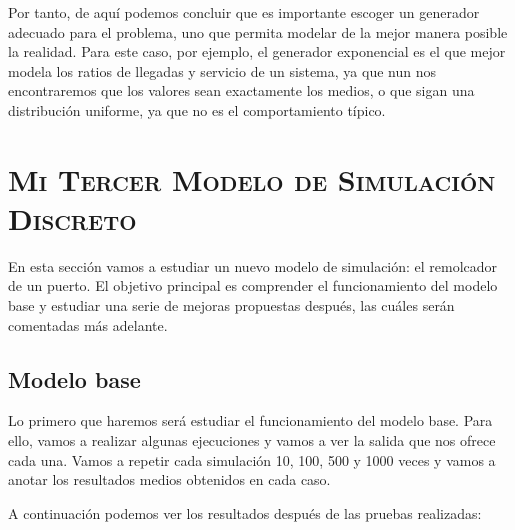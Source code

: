 \documentclass[11pt,a4paper]{article}
\begin{document}
Por tanto, de aquí podemos concluir que es importante escoger un generador
adecuado para el problema, uno que permita modelar de la mejor manera posible
la realidad. Para este caso, por ejemplo, el generador exponencial es el que
mejor modela los ratios de llegadas y servicio de un sistema, ya que nun
nos encontraremos que los valores sean exactamente los medios, o que sigan una
distribución uniforme, ya que no es el comportamiento típico.

\newpage

\section{\textsc{Mi Tercer Modelo de Simulación Discreto}}

En esta sección vamos a estudiar un nuevo modelo de simulación: el remolcador
de un puerto. El objetivo principal es comprender el funcionamiento del modelo
base y estudiar una serie de mejoras propuestas después, las cuáles serán comentadas
más adelante.

\subsection{Modelo base}

Lo primero que haremos será estudiar el funcionamiento del modelo base. Para ello, vamos
a realizar algunas ejecuciones y vamos a ver la salida que nos ofrece cada una. Vamos a
repetir cada simulación 10, 100, 500 y 1000 veces y vamos a anotar los resultados
medios obtenidos en cada caso.

A continuación podemos ver los resultados después de las pruebas realizadas:
\end{document}
